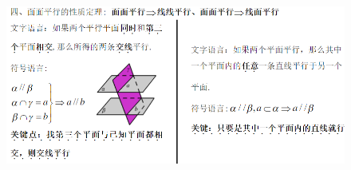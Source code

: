 \documentclass[hyperref, UTF8,11pt,a4paper]{ctexart} %
\begin{document}
	\begin{figure}[!h] %
		\centering
		\includegraphics[width=450pt]  {pic/litijihe/mmpxxz.png} \\

	\end{figure}
\end{document}
